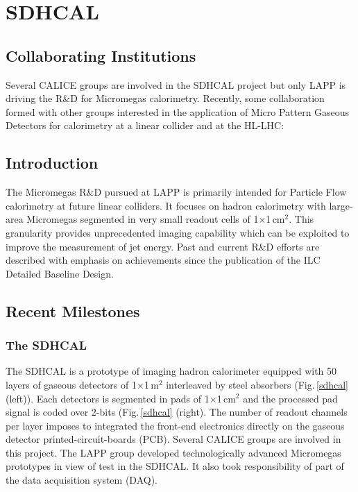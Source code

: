 \section{SDHCAL}
\subsection{Collaborating Institutions}
Several CALICE groups are involved in the SDHCAL project but only LAPP is driving the R\&D for Micromegas calorimetry. Recently, some collaboration formed with other groups interested in the application of Micro Pattern Gaseous Detectors for calorimetry at a linear collider and at the HL-LHC:

\subsection{Introduction}
The Micromegas R\&D pursued at LAPP is primarily intended for Particle Flow calorimetry at future linear colliders. It focuses on hadron calorimetry with large-area Micromegas segmented in very small readout cells of 1$\times$1\,cm$^{2}$. This granularity provides unprecedented imaging capability which can be exploited to improve the measurement of jet energy. Past and current R\&D efforts are described with emphasis on achievements since the publication of the ILC Detailed Baseline Design.
\subsection{Recent Milestones}


\subsubsection{The SDHCAL}

The SDHCAL is a prototype of imaging hadron calorimeter equipped with 50 layers of gaseous detectors of 1$\times$1\,m$^{2}$ interleaved by steel absorbers (Fig.\,\ref{sdhcal} (left)). Each detectors is segmented in pads of 1$\times$1\,cm$^{2}$ and the processed pad signal is coded over 2-bits (Fig.\,\ref{sdhcal} (right). The number of readout channels per layer imposes to integrated the front-end electronics directly on the gaseous detector printed-circuit-boards (PCB). Several CALICE groups are involved in this project. The LAPP group developed technologically advanced Micromegas prototypes in view of test in the SDHCAL. It also took responsibility of part of the data acquisition system (DAQ).


